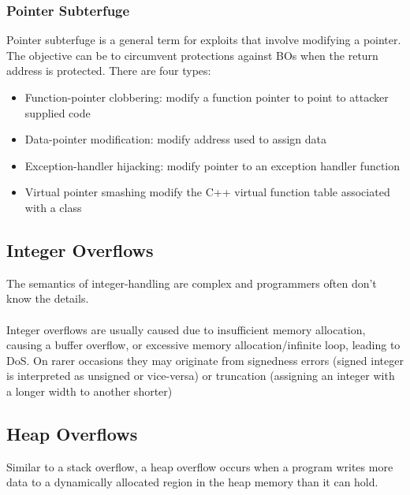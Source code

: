 \documentclass[10pt,a4paper]{report}
\begin{document}
\subsubsection{Pointer Subterfuge}
Pointer subterfuge is a general term for exploits that involve modifying a pointer. The objective can be to circumvent protections against BOs when the return address is protected. There are four types:
\begin{itemize}
\item Function-pointer clobbering: modify a function pointer to point to attacker supplied code
\item Data-pointer modification: modify address used to assign data
\item Exception-handler hijacking: modify pointer to an exception handler function
\item Virtual pointer smashing modify the C++ virtual function table associated with a class
\end{itemize}
\subsection{Integer Overflows}
The semantics of integer-handling are complex and programmers often don’t know the details.\\
\\
Integer overflows are usually caused due to insufficient memory allocation, causing a buffer overflow, or excessive memory allocation/infinite loop, leading to DoS. On rarer occasions they may originate from signedness errors (signed integer is interpreted as unsigned or vice-versa) or truncation (assigning an integer with a longer width to another shorter)
\subsection{Heap Overflows}
Similar to a stack overflow, a heap overflow occurs when a program writes more data to a dynamically allocated region in the heap memory than it can hold.
\end{document}
